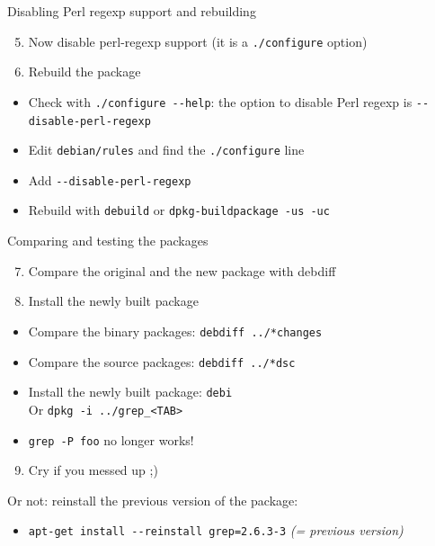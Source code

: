 \documentclass[10pt,final]{beamer}
\begin{document}
\begin{frame}{Disabling Perl regexp support and rebuilding}
	\begin{enumerate}
			\setcounter{enumi}{4}

	\item Now disable perl-regexp support (it is a \texttt{./configure} option)
	\item Rebuild the package
	\end{enumerate}
	\hbr
	\begin{itemize}
	  \item Check with \texttt{./configure -{}-help}: the option to disable
	    Perl regexp is \texttt{-{}-disable-perl-regexp}
	\hbr
		\item Edit \texttt{debian/rules} and find the \texttt{./configure} line
	\hbr
		\item Add \texttt{-{}-disable-perl-regexp}
	\hbr
		\item Rebuild with \texttt{debuild} or \texttt{dpkg-buildpackage -us -uc}
	\end{itemize}
\end{frame}

\begin{frame}{Comparing and testing the packages}
	\begin{enumerate}
			\setcounter{enumi}{6}

	\item Compare the original and the new package with debdiff
	\item Install the newly built package
	\end{enumerate}
	\hbr
	\begin{itemize}
		\item Compare the binary packages: \texttt{debdiff ../*changes}
	\hbr
		\item Compare the source packages: \texttt{debdiff ../*dsc}
	\hbr
		\item Install the newly built package: \texttt{debi}\\
			Or \texttt{dpkg -i ../grep\_<TAB>}
	\hbr
		\item \texttt{grep -P foo} no longer works!
	\end{itemize}
\br
\begin{enumerate}
		\setcounter{enumi}{8}
	\item Cry if you messed up ;)
\end{enumerate}
\hbr
Or not: reinstall the previous version of the package:
\begin{itemize}
	\item \texttt{apt-get install -{}-reinstall grep=2.6.3-3} \textit{(= previous version)}
\end{itemize}
\end{frame}
\end{document}
